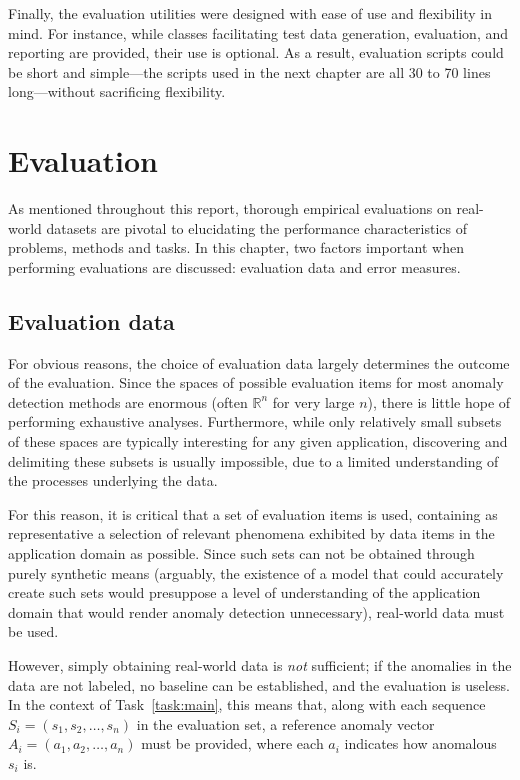 Finally, the evaluation utilities were designed with ease of use and flexibility in mind. For instance, while classes facilitating test data generation, evaluation, and reporting are provided, their use is optional. As a result, evaluation scripts could be short and simple---the scripts used in the next chapter are all 30 to 70 lines long---without sacrificing flexibility.

\section{Evaluation}
\label{ch:evaluation}

As mentioned throughout this report, thorough empirical evaluations on real-world datasets are pivotal to elucidating the performance characteristics of problems, methods and tasks. In this chapter, two factors important when performing evaluations are discussed: evaluation data and error measures.

\subsection{Evaluation data}
\label{sect:evaluation_data}

For obvious reasons, the choice of evaluation data largely determines the outcome of the evaluation. Since the spaces of possible evaluation items for most anomaly detection methods are enormous (often $\mathbb{R}^n$ for very large $n$), there is little hope of performing exhaustive analyses. Furthermore, while only relatively small subsets of these spaces are typically interesting for any given application, discovering and delimiting these subsets is usually impossible, due to a limited understanding of the processes underlying the data.

For this reason, it is critical that a set of evaluation items is used, containing as representative a selection of relevant phenomena exhibited by data items in the application domain as possible. Since such sets can not be obtained through purely synthetic means (arguably, the existence of a model that could accurately create such sets would presuppose a level of understanding of the application domain that would render anomaly detection unnecessary), real-world data must be used.

However, simply obtaining real-world data is \emph{not} sufficient; if the anomalies in the data are not labeled, no baseline can be established, and the evaluation is useless. In the context of Task~\ref{task:main}, this means that, along with each sequence $S_i = (s_1, s_2, \dots, s_n)$ in the evaluation set, a reference anomaly vector $A_i = (a_1, a_2, \dots, a_n)$ must be provided, where each $a_i$ indicates how anomalous $s_i$ is.

